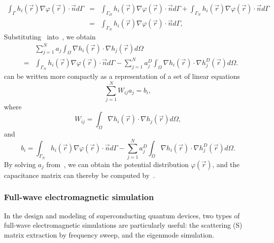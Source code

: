 \documentclass[a4paper,onecolumn,11pt,unpublished]{quantumarticle}
\begin{document}
\begin{eqnarray}
    \int_{\Gamma}h_{i}\left(\vec{r}\right)\nabla\varphi\left(\vec{r}\right)\cdot\vec{n}d\Gamma
&=&\int_{\Gamma_{D}}h_{i}\left(\vec{r}\right)\nabla\varphi\left(\vec{r}\right)\cdot\vec{n}d\Gamma+\int_{\Gamma_{N}}h_{i}\left(\vec{r}\right)\nabla\varphi\left(\vec{r}\right)\cdot\vec{n}d\Gamma \nonumber \\
&=&\int_{\Gamma_{N}}h_{i}\left(\vec{r}\right)\nabla\varphi\left(\vec{r}\right)\cdot\vec{n}d\Gamma,
\end{eqnarray}
Substituting~ into~, we obtain
\begin{eqnarray}
    & &\sum_{j=1}^{N}a_{j}\int_{\Omega}\nabla h_{i}\left(\vec{r}\right)\cdot\nabla h_{j}\left(\vec{r}\right)d\Omega \nonumber \\
    &=&\int_{\Gamma_{N}}h_{i}\left(\vec{r}\right)\nabla\varphi\left(\vec{r}\right)\cdot\vec{n}d\Gamma-\sum_{j=1}^{N}a_{j}^{D}\int_{\Omega}\nabla h_{i}\left(\vec{r}\right)\cdot\nabla h_{j}^{D}\left(\vec{r}\right)d\Omega .
    \label{eq:fem}
\end{eqnarray}
 can be written more compactly as a representation of a set of linear equations
\begin{equation}
    \sum_{j=1}^{N}W_{ij}a_{j}=b_{i},
    \label{eq:fem_compact}
\end{equation}
where
\begin{equation}
    W_{ij}=\int_{\Omega}\nabla h_{i}\left(\vec{r}\right)\cdot\nabla h_{j}\left(\vec{r}\right)d\Omega,
\end{equation}
and
\begin{equation}
b_{i}=\int_{\Gamma_{N}}h_{i}\left(\vec{r}\right)\nabla\varphi\left(\vec{r}\right)\cdot\vec{n}d\Gamma-\sum_{j=1}^{N}a_{j}^{D}\int_{\Omega}\nabla h_{i}\left(\vec{r}\right)\cdot\nabla h_{j}^{D}\left(\vec{r}\right)d\Omega.
\end{equation}
By solving $a_j$ from~, we can obtain the potential distribution $\varphi\left(\vec{r}\right)$, and the capacitance matrix can thereby be computed by~.

\subsubsection{Full-wave electromagnetic simulation}

In the design and modeling of superconducting quantum devices, two types of full-wave electromagnetic simulations are particularly useful: the scattering (S) matrix extraction by frequency sweep, and the eigenmode simulation. 
\end{document}
